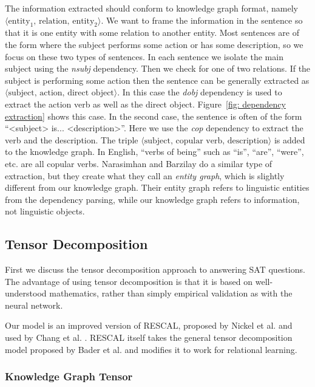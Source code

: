 \documentclass[pageno]{final_paper}
\begin{document}
The information extracted should conform to knowledge graph format, namely
\\$\langle \text{entity}_1, \,\text{relation}, \,\text{entity}_2 \rangle$. We
want to frame the information in the sentence so that it is one entity with some
relation to another entity. Most sentences are of the form where the subject
performs some action or has some description, so we focus on these two types of
sentences. In each sentence we isolate the main subject using the \textit{nsubj}
dependency. Then we check for one of two relations. If the subject is performing
some action then the sentence can be generally extracted as $\langle
\text{subject}, \,\text{action}, \,\text{direct object} \rangle$. In this case
the \textit{dobj} dependency is used to extract the action verb as well as the
direct object. Figure~\ref{fig: dependency extraction} shows this case. In the
second case, the sentence is often of the form ``<subject> is...
<description>''. Here we use the \textit{cop} dependency to extract the verb and
the description. The triple $\langle \text{subject}, \,\text{copular verb},
\,\text{description} \rangle$ is added to the knowledge graph. In English,
``verbs of being'' such as ``is'', ``are'', ``were'', etc. are all copular
verbs. Narasimhan and Barzilay \cite{Narasimhan2015} do a similar type of
extraction, but they create what they call an \textit{entity graph}, which is
slightly different from our knowledge graph. Their entity graph refers to
linguistic entities from the dependency parsing, while our knowledge graph
refers to information, not linguistic objects.

\subsection{Tensor Decomposition}
\label{Tensor Decomposition}

First we discuss the tensor decomposition approach to answering SAT questions.
The advantage of using tensor decomposition is that it is based on
well-understood mathematics, rather than simply empirical validation as with the
neural network.

Our model is an improved version of RESCAL, proposed by Nickel et al.
\cite{Nickel2011} and used by Chang et al. \cite{Chang2014}. RESCAL itself takes
the general tensor decomposition model proposed by Bader et al. \cite{Bader2007}
and modifies it to work for relational learning.

\subsubsection{Knowledge Graph Tensor}
\label{Knowledge Graph Tensor}
\end{document}
